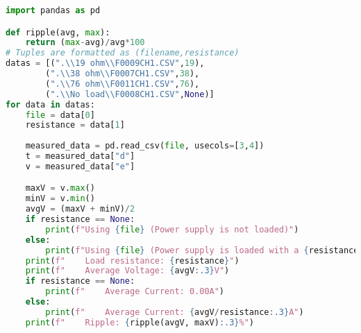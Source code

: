 \begin{lstlisting}[language=Python]
import pandas as pd

def ripple(avg, max):
    return (max-avg)/avg*100
# Tuples are formatted as (filename,resistance)
datas = [(".\\19 ohm\\F0009CH1.CSV",19),
    	(".\\38 ohm\\F0007CH1.CSV",38),
    	(".\\76 ohm\\F0011CH1.CSV",76),
    	(".\\No load\\F0008CH1.CSV",None)]
for data in datas:
    file = data[0]
    resistance = data[1]
    
    measured_data = pd.read_csv(file, usecols=[3,4])
    t = measured_data["d"]
    v = measured_data["e"]

    maxV = v.max()
    minV = v.min()
    avgV = (maxV + minV)/2
    if resistance == None:
        print(f"Using {file} (Power supply is not loaded)")
    else:
        print(f"Using {file} (Power supply is loaded with a {resistance} Ohm resistor)")
    print(f"    Load resistance: {resistance}")   
    print(f"    Average Voltage: {avgV:.3}V")
    if resistance == None:
        print(f"    Average Current: 0.00A")
    else:
        print(f"    Average Current: {avgV/resistance:.3}A")
    print(f"    Ripple: {ripple(avgV, maxV):.3}%")

\end{lstlisting}



